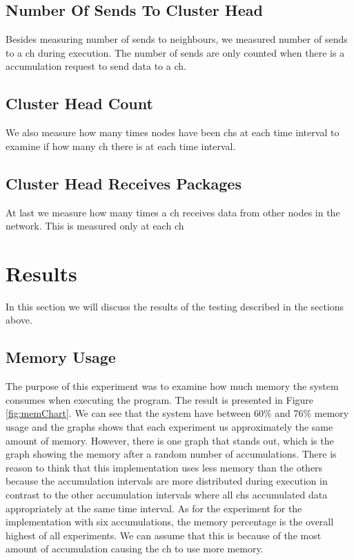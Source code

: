 \documentclass[USenglish]{uit-thesis}
\begin{document}
\subsection{Number Of Sends To Cluster Head}
Besides measuring number of sends to neighbours, we measured number of sends to a \gls{ch} during execution. The number of sends are only counted when there is a accumulation request to send data to a \gls{ch}.


\subsection{Cluster Head Count}
We also measure how many times nodes have been \gls{ch}s at each time interval to examine if how many \gls{ch} there is at each time interval.

\subsection{Cluster Head Receives Packages}
At last we measure how many times a \gls{ch} receives data from other nodes in the network. This is measured only at each \gls{ch}

\newpage

\section{Results}

In this section we will discuss the results of the testing described in the sections above.

\subsection{Memory Usage}

The purpose of this experiment was to examine how much memory the system consumes when executing the program. The result is presented in Figure \ref{fig:memChart}. We can see that the system have between 60\% and 76\% memory usage and the graphs shows that each experiment us approximately the same amount of memory. However, there is one graph that stands out, which is the graph showing the memory after a random number of accumulations.
There is reason to think that this implementation uses less memory than the others because the accumulation intervals are more distributed during execution in contrast to the other accumulation intervals where all \gls{ch}s accumulated data appropriately at the same time interval. As for the experiment for the implementation with six accumulations, the memory percentage is the overall highest of all experiments. We can assume that this is because of the most amount of accumulation causing the \gls{ch} to use more memory.
\end{document}
